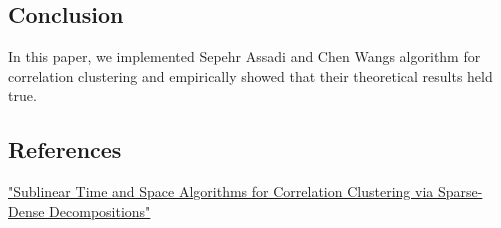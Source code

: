 \documentclass[
]{article}
\begin{document}
\hypertarget{conclusion}{%
\subsection{Conclusion}\label{conclusion}}

In this paper, we implemented Sepehr Assadi and Chen
Wang\textquotesingle s algorithm for correlation clustering and
empirically showed that their theoretical results held true.

\hypertarget{references}{%
\subsection{References}\label{references}}

\href{https://doi.org/10.48550/arxiv.2109.14528}{"Sublinear Time and
Space Algorithms for Correlation Clustering via Sparse-Dense
Decompositions"}
\end{document}
